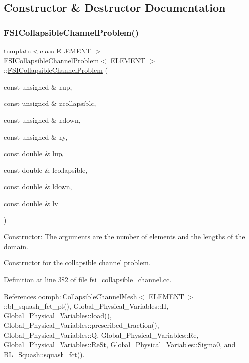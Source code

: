 \subsection{Constructor \& Destructor Documentation}
\mbox{\label{classFSICollapsibleChannelProblem_afe14ae0d2bdfc9a15969c9bdcd6e2512}} 
\subsubsection{\texorpdfstring{F\+S\+I\+Collapsible\+Channel\+Problem()}{FSICollapsibleChannelProblem()}\hspace{0.1cm}{\footnotesize\ttfamily [1/4]}}
{\footnotesize\ttfamily template$<$class E\+L\+E\+M\+E\+NT $>$ \\
\hyperlink{classFSICollapsibleChannelProblem}{F\+S\+I\+Collapsible\+Channel\+Problem}$<$ E\+L\+E\+M\+E\+NT $>$\+::\hyperlink{classFSICollapsibleChannelProblem}{F\+S\+I\+Collapsible\+Channel\+Problem} (\begin{DoxyParamCaption}\item[{const unsigned \&}]{nup,  }\item[{const unsigned \&}]{ncollapsible,  }\item[{const unsigned \&}]{ndown,  }\item[{const unsigned \&}]{ny,  }\item[{const double \&}]{lup,  }\item[{const double \&}]{lcollapsible,  }\item[{const double \&}]{ldown,  }\item[{const double \&}]{ly }\end{DoxyParamCaption})}



Constructor\+: The arguments are the number of elements and the lengths of the domain. 

Constructor for the collapsible channel problem. 

Definition at line 382 of file fsi\+\_\+collapsible\+\_\+channel.\+cc.



References oomph\+::\+Collapsible\+Channel\+Mesh$<$ E\+L\+E\+M\+E\+N\+T $>$\+::bl\+\_\+squash\+\_\+fct\+\_\+pt(), Global\+\_\+\+Physical\+\_\+\+Variables\+::H, Global\+\_\+\+Physical\+\_\+\+Variables\+::load(), Global\+\_\+\+Physical\+\_\+\+Variables\+::prescribed\+\_\+traction(), Global\+\_\+\+Physical\+\_\+\+Variables\+::Q, Global\+\_\+\+Physical\+\_\+\+Variables\+::\+Re, Global\+\_\+\+Physical\+\_\+\+Variables\+::\+Re\+St, Global\+\_\+\+Physical\+\_\+\+Variables\+::\+Sigma0, and B\+L\+\_\+\+Squash\+::squash\+\_\+fct().

